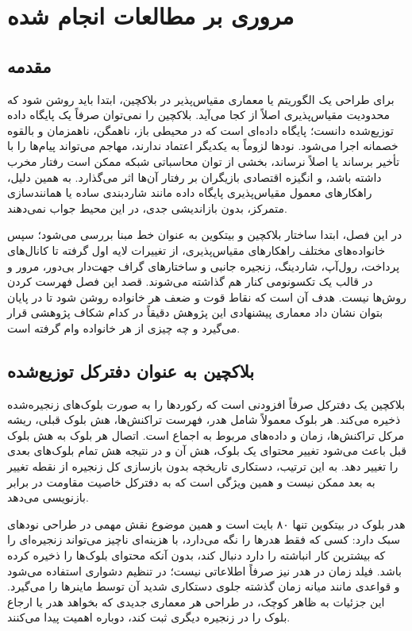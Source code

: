 \chapter{مروری بر مطالعات انجام شده}
\section{مقدمه}

برای طراحی یک الگوریتم یا معماری مقیاس‌پذیر در بلاکچین، ابتدا باید روشن شود که محدودیت مقیاس‌پذیری اصلاً از کجا می‌آید. بلاکچین را نمی‌توان صرفاً یک پایگاه داده توزیع‌شده دانست؛ پایگاه داده‌ای است که در محیطی باز، ناهمگن، ناهمزمان و بالقوه خصمانه اجرا می‌شود. نودها لزوماً به یکدیگر اعتماد ندارند، مهاجم می‌تواند پیام‌ها را با تأخیر برساند یا اصلاً نرساند، بخشی از توان محاسباتی شبکه ممکن است رفتار مخرب داشته باشد، و انگیزه اقتصادی بازیگران بر رفتار آن‌ها اثر می‌گذارد. به همین دلیل، راهکارهای معمول مقیاس‌پذیری پایگاه داده مانند شاردبندی ساده یا همانندسازی متمرکز، بدون بازاندیشی جدی، در این محیط جواب نمی‌دهند.

در این فصل، ابتدا ساختار بلاکچین و بیتکوین به عنوان خط مبنا بررسی می‌شود؛ سپس خانواده‌های مختلف راهکارهای مقیاس‌پذیری، از تغییرات لایه اول گرفته تا کانال‌های پرداخت، رول‌آپ، شاردینگ، زنجیره جانبی و ساختارهای گراف جهت‌دار بی‌دور، مرور و در قالب یک تکسونومی کنار هم گذاشته می‌شوند. قصد این فصل فهرست کردن روش‌ها نیست. هدف آن است که نقاط قوت و ضعف هر خانواده روشن شود تا در پایان بتوان نشان داد معماری پیشنهادی این پژوهش دقیقاً در کدام شکاف پژوهشی قرار می‌گیرد و چه چیزی از هر خانواده وام گرفته است.

\section{بلاکچین به عنوان دفترکل توزیع‌شده}

بلاکچین یک دفترکل صرفاً افزودنی است که رکوردها را به صورت بلوک‌های زنجیره‌شده ذخیره می‌کند. هر بلوک معمولاً شامل هدر، فهرست تراکنش‌ها، هش بلوک قبلی، ریشه مرکل تراکنش‌ها، زمان و داده‌های مربوط به اجماع است. اتصال هر بلوک به هش بلوک قبل باعث می‌شود تغییر محتوای یک بلوک، هش آن و در نتیجه هش تمام بلوک‌های بعدی را تغییر دهد. به این ترتیب، دستکاری تاریخچه بدون بازسازی کل زنجیره از نقطه تغییر به بعد ممکن نیست و همین ویژگی است که به دفترکل خاصیت مقاومت در برابر بازنویسی می‌دهد.

هدر بلوک در بیتکوین تنها ۸۰ بایت است و همین موضوع نقش مهمی در طراحی نودهای سبک دارد: کسی که فقط هدرها را نگه می‌دارد، با هزینه‌ای ناچیز می‌تواند زنجیره‌ای را که بیشترین کار انباشته را دارد دنبال کند، بدون آنکه محتوای بلوک‌ها را ذخیره کرده باشد. فیلد زمان در هدر نیز صرفاً اطلاعاتی نیست؛ در تنظیم دشواری استفاده می‌شود و قواعدی مانند میانه زمان گذشته جلوی دستکاری شدید آن توسط ماینرها را می‌گیرد. این جزئیات به ظاهر کوچک، در طراحی هر معماری جدیدی که بخواهد هدر یا ارجاع بلوک را در زنجیره دیگری ثبت کند، دوباره اهمیت پیدا می‌کنند.

